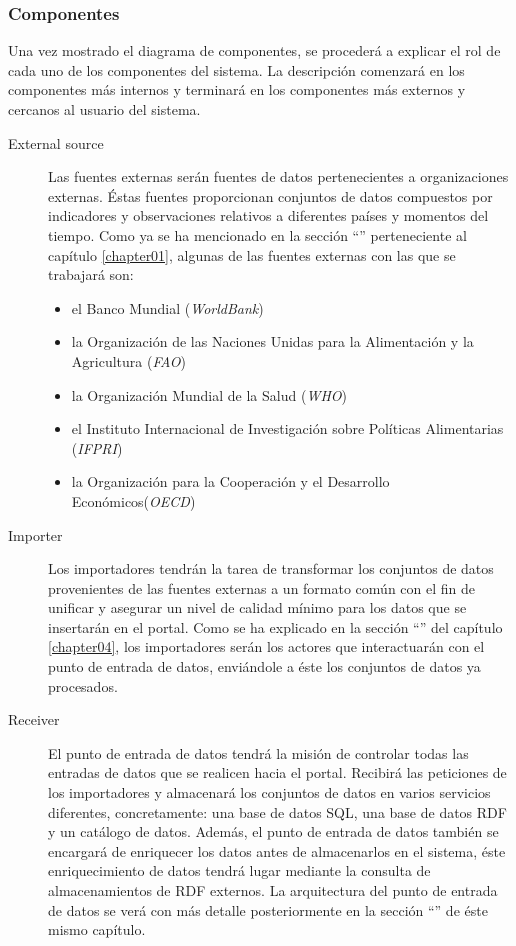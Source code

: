 \subsubsection{Componentes}
Una vez mostrado el diagrama de componentes, se procederá a explicar el rol de cada uno de los componentes del sistema.  La descripción comenzará en los componentes más internos y terminará en los componentes más externos y cercanos al usuario del sistema.
\begin{description}
	\item[External source]  Las fuentes externas  serán fuentes de datos pertenecientes a organizaciones externas.  Éstas fuentes proporcionan conjuntos de datos compuestos por indicadores y observaciones relativos a diferentes países y momentos del tiempo.  Como ya se ha mencionado en la sección ``'' perteneciente al capítulo \ref{chapter01}, algunas de las fuentes externas con las que se trabajará son:
	\begin{itemize}
		\item el Banco Mundial (\textit{WorldBank})
		\item la Organización de las Naciones Unidas para la Alimentación y la Agricultura (\textit{FAO})
		\item la Organización Mundial de la Salud (\textit{WHO})
		\item el Instituto Internacional de Investigación sobre Políticas Alimentarias (\textit{IFPRI})
		\item la Organización para la Cooperación y el Desarrollo Económicos(\textit{OECD})
	\end{itemize}
	\item[Importer]  Los importadores  tendrán la tarea de transformar los conjuntos de datos provenientes de las fuentes externas a un formato común con el fin de unificar y asegurar un nivel de calidad mínimo para los datos que se insertarán en el portal.  Como se ha explicado en la sección ``'' del capítulo \ref{chapter04}, los importadores serán los actores que interactuarán con el punto de entrada de datos, enviándole a éste los conjuntos de datos ya procesados.
	\item[Receiver]  El punto de entrada de datos  tendrá la misión de controlar todas las entradas de datos que se realicen hacia el portal.  Recibirá las peticiones de los importadores y almacenará los conjuntos de datos en varios servicios diferentes, concretamente: una base de datos SQL, una base de datos RDF y un catálogo de datos.  Además, el punto de entrada de datos también se encargará de enriquecer los datos antes de almacenarlos en el sistema, éste enriquecimiento de datos tendrá lugar mediante la consulta de almacenamientos de RDF externos.  La arquitectura del punto de entrada de datos se verá con más detalle posteriormente en la sección ``'' de éste mismo capítulo.

\end{description}
